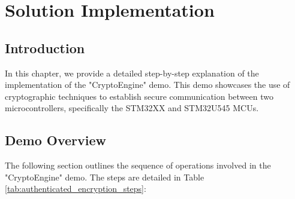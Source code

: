\chapter{Solution Implementation}
\label{ch:implementation}

\section*{Introduction}
In this chapter, we provide a detailed step-by-step explanation of the implementation of the "CryptoEngine" demo. This demo showcases the use of cryptographic techniques to establish secure communication between two microcontrollers, specifically the STM32XX and STM32U545 MCUs.

\section{Demo Overview}
The following section outlines the sequence of operations involved in the "CryptoEngine" demo.
The steps are detailed in Table \ref{tab:authenticated_encryption_steps}:
